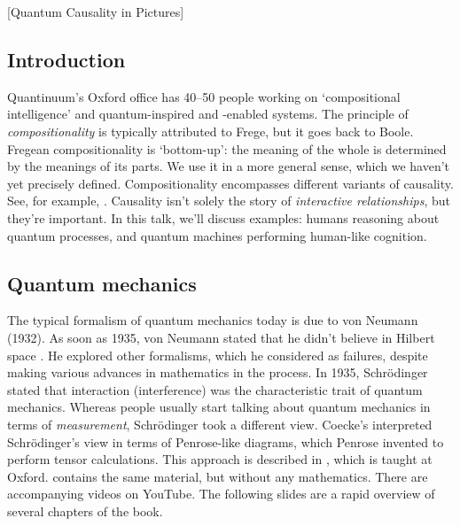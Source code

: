[Quantum Causality in Pictures]

\begin{affils}
\end{affils}

\subsection*{Introduction}

Quantinuum's Oxford office has 40--50 people working on `compositional intelligence'
and quantum-inspired and -enabled systems.
The principle of \emph{compositionality} is typically attributed to Frege, but it goes
back to Boole.
Fregean compositionality is `bottom-up': the meaning of the whole is determined by the
meanings of its parts.
We use it in a more general sense, which we haven't yet precisely defined.
Compositionality encompasses different variants of causality.
See, for example, \textcites{Kissinger2017}{Cho2019}{Schmid2020}{Lorenz2023}.
Causality isn't solely the story of \emph{interactive relationships}, but they're
important.
In this talk, we'll discuss examples: humans reasoning about quantum processes, and
quantum machines performing human-like cognition.

\subsection*{Quantum mechanics}

The typical formalism of quantum mechanics today is due to von Neumann (1932).
As soon as 1935, von Neumann stated that he didn't believe in Hilbert space
\parencites{Redei1996}.
He explored other formalisms, which he considered as failures, despite making various
advances in mathematics in the process.
In 1935, Schr\"odinger stated that interaction (interference) was the characteristic
trait of quantum mechanics.
Whereas people usually start talking about quantum mechanics in terms of
\emph{measurement}, Schr\"odinger took a different view.
Coecke's  \parencites*{Coecke2006} interpreted Schr\"odinger's
view in terms of Penrose-like diagrams, which Penrose invented to perform tensor
calculations.
This approach is described in  \parencites*{Coecke2017}, which is
taught at Oxford.
 \parencites*{Coecke2023} contains the same material, but without
any mathematics.
There are accompanying videos on YouTube.
The following slides are a rapid overview of several chapters of the book.

